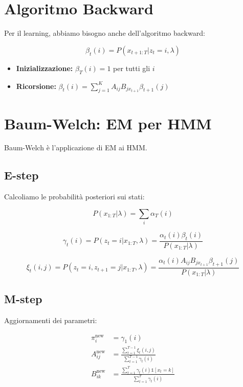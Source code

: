 \section{Algoritmo Backward}

Per il learning, abbiamo bisogno anche dell'algoritmo backward:

\begin{definition}
  \[\beta_t(i) = P(x_{t+1:T} | z_t = i, \lambda)\]
\end{definition}

\begin{theorem}
  \begin{itemize}
    \item \textbf{Inizializzazione:} $\beta_T(i) = 1$ per tutti gli $i$
    \item \textbf{Ricorsione:} $\beta_t(i) = \sum_{j=1}^K A_{ij} B_{jx_{t+1}} \beta_{t+1}(j)$
  \end{itemize}
\end{theorem}

\section{Baum-Welch: EM per HMM}

Baum-Welch è l'applicazione di EM ai HMM.

\subsection{E-step}

Calcoliamo le probabilità posteriori sui stati:

\[P(x_{1:T}|\lambda) = \sum_i \alpha_T(i)\]

\[\gamma_t(i) = P(z_t = i | x_{1:T}, \lambda) = \frac{\alpha_t(i) \beta_t(i)}{P(x_{1:T}|\lambda)}\]

\[\xi_t(i,j) = P(z_t = i, z_{t+1} = j | x_{1:T}, \lambda) = \frac{\alpha_t(i) A_{ij} B_{jx_{t+1}} \beta_{t+1}(j)}{P(x_{1:T}|\lambda)}\]

\subsection{M-step}

Aggiornamenti dei parametri:

\begin{align}
  \pi_i^{\text{new}} &= \gamma_1(i) \\
  A_{ij}^{\text{new}} &= \frac{\sum_{t=1}^{T-1} \xi_t(i,j)}{\sum_{t=1}^{T-1} \gamma_t(i)} \\
  B_{ik}^{\text{new}} &= \frac{\sum_{t=1}^T \gamma_t(i) \mathbb{1}[x_t = k]}{\sum_{t=1}^T \gamma_t(i)}
\end{align}

